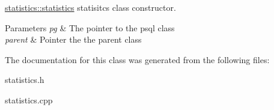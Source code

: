 \mbox{\hyperlink{classstatistics_aaa102e49836a3b719df3a82e28735adc}{statistics\+::statistics}} statisitcs class constructor. 


\begin{DoxyParams}{Parameters}
{\em pg} & The pointer to the psql class \\
\hline
{\em parent} & Pointer the the parent class \\
\hline
\end{DoxyParams}


The documentation for this class was generated from the following files\+:\begin{DoxyCompactItemize}
\item 
statistics.\+h\item 
statistics.\+cpp\end{DoxyCompactItemize}
